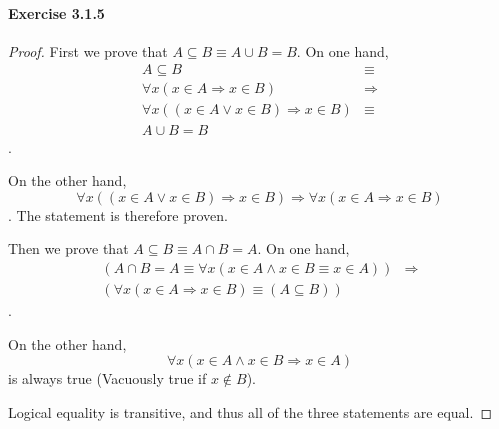 \paragraph{Exercise 3.1.5} \label{exercise3.1.5}
\begin{proof}
First we prove that $A \subseteq B \equiv A \cup B = B$. On one hand,
\begin{align*}
A \subseteq B 
&\equiv \\
\forall x(x \in A \Longrightarrow x \in B)
&\Longrightarrow \\
\forall x((x \in A \vee x \in B) \Longrightarrow x \in B)
&\equiv \\
A \cup B = B
\end{align*}.

On the other hand,
\[
\forall x((x \in A \vee x \in B) \Longrightarrow x \in B) \Longrightarrow
\forall x(x \in A \Longrightarrow x \in B)
\]. The statement is therefore proven.

Then we prove that $A \subseteq B \equiv A \cap B = A$. On one hand, 
\begin{align*}
(A \cap B = A \equiv \forall x(x \in A \wedge x \in B \equiv x \in A)) 
&\Longrightarrow \\
(\forall x(x \in A \Rightarrow x \in B) \equiv (A \subseteq B))
\end{align*}.

On the other hand, 
\[
\forall x(x\in A\wedge x \in B \Longrightarrow x \in A)
\]
is always true (Vacuously true if $x \notin B$).

Logical equality is transitive, and thus all of the three statements are equal.
\end{proof}

